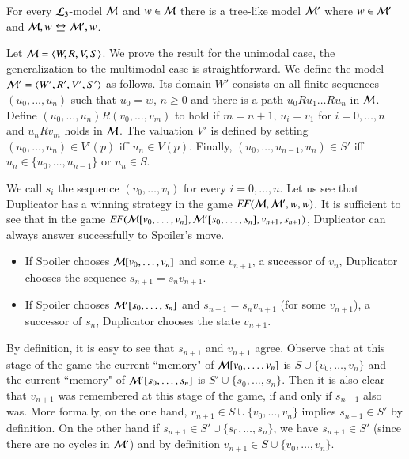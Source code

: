\begin{pro}\label{prop:tree-model-property}
For every $\mathcal{L}_3$-model
$\mathcal{M}$ and $w\in\mathcal{M}$ there is a tree-like model $\mathcal{M}'$ where
$w\in\mathcal{M}'$ and $\model,w\bisim\model',w$.
\end{pro}

\begin{pf}
Let $\mathcal{M}=\langle W,R,V,S \rangle$.  We prove the result for the unimodal
case, the generalization to the multimodal case is straightforward.
We define the model $\mathcal{M}'=\langle W',R',V',S' \rangle$ as follows. Its
domain $W'$ consists on all finite sequences $(u_0,\dots,u_n)$ such
that $u_0=w$, $n\geq 0$ and there is a path $u_0Ru_1\dots Ru_n$ in
$\mathcal{M}$. Define $(u_0,\dots,u_n)R(v_0,\dots,v_m)$ to hold if
$m=n+1$, $u_i=v_1$ for $i=0,\dots,n$ and $u_nRv_m$ holds in
$\mathcal{M}$. The valuation $V'$ is defined by setting
$(u_0,\dots,u_n)\in V'(p)$ iff $u_n\in V(p)$. Finally,
$(u_0,\dots,u_{n-1},u_n)\in S'$ iff $u_n\in\{u_0,\dots,u_{n-1}\}$ or
$u_n\in S$.

We call $s_i$ the sequence $(v_0,\dots,v_i)$ for every
$i=0,\dots,n$. Let us see that Duplicator has a winning strategy in
the game $\mathit{EF}(\mathcal{M},\mathcal{M}',w,w)$. It is sufficient to see that in
the game
$\mathit{EF}(\mathcal{M}[v_0,\dots,v_n],\mathcal{M}'[s_0,\dots,s_n],v_{n+1},s_{n+1})$,
Duplicator can always answer successfully to Spoiler's move.
\begin{itemize}
\item
If Spoiler chooses $\mathcal{M}[v_0,\dots,v_n]$ and some $v_{n+1}$, a
successor of $v_n$, Duplicator chooses the sequence
$s_{n+1}=s_nv_{n+1}$.

\item
If Spoiler chooses $\mathcal{M}'[s_0,\dots,s_n]$ and $s_{n+1}=s_nv_{n+1}$
(for some $v_{n+1}$), a successor of $s_n$, Duplicator chooses the
state $v_{n+1}$.
\end{itemize}
By definition, it is easy to see that $s_{n+1}$ and $v_{n+1}$ agree.
Observe that at this stage of the game the current ``memory" of
$\mathcal{M}[v_0,\dots,v_n]$ is $S \cup \{v_0,\dots,v_n\}$ and the
current ``memory" of $\mathcal{M}'[s_0,\dots,s_n]$ is $S' \cup
\{s_0,\dots,s_n\}$. Then it is also clear that $v_{n+1}$ was
remembered at this stage of the game, if and only if $s_{n+1}$ also
was. More formally, on the one hand, $v_{n+1}\in S \cup
\{v_0,\dots,v_n\}$ implies $s_{n+1} \in S'$ by definition. On the
other hand if $s_{n+1}\in S' \cup \{s_0,\dots,s_n\}$, we have
$s_{n+1}\in S'$ (since there are no cycles in $\mathcal{M}'$) and by
definition $v_{n+1}\in S \cup \{v_0,\dots,v_n\}$.
\end{pf}

